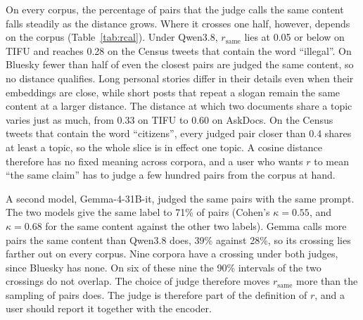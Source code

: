On every corpus, the percentage of pairs that the judge calls the same content falls steadily as the distance grows. Where it crosses one half, however, depends on the corpus (Table~\ref{tab:rcal}). Under Qwen3.8, $r_{\mathrm{same}}$ lies at 0.05 or below on TIFU and reaches 0.28 on the Census tweets that contain the word ``illegal''. On Bluesky fewer than half of even the closest pairs are judged the same content, so no distance qualifies. Long personal stories differ in their details even when their embeddings are close, while short posts that repeat a slogan remain the same content at a larger distance. The distance at which two documents share a topic varies just as much, from 0.33 on TIFU to 0.60 on AskDocs. On the Census tweets that contain the word ``citizens'', every judged pair closer than 0.4 shares at least a topic, so the whole slice is in effect one topic. A cosine distance therefore has no fixed meaning across corpora, and a user who wants $r$ to mean ``the same claim'' has to judge a few hundred pairs from the corpus at hand.

A second model, Gemma-4-31B-it, judged the same pairs with the same prompt. The two models give the same label to 71\% of pairs (Cohen's $\kappa = 0.55$, and $\kappa = 0.68$ for the same content against the other two labels). Gemma calls more pairs the same content than Qwen3.8 does, 39\% against 28\%, so its crossing lies farther out on every corpus. Nine corpora have a crossing under both judges, since Bluesky has none. On six of these nine the 90\% intervals of the two crossings do not overlap. The choice of judge therefore moves $r_{\mathrm{same}}$ more than the sampling of pairs does. The judge is therefore part of the definition of $r$, and a user should report it together with the encoder.

